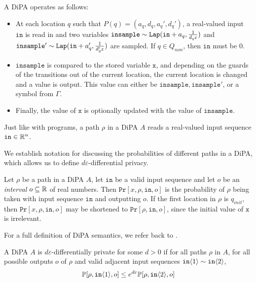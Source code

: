 A DiPA operates as follows: 
\begin{itemize}
    \item At each location $q$ such that $P(q) = (a_q, d_q, a_q', d_q')$, a real-valued input $\texttt{in}$ is read in and two variables $\texttt{insample}\sim \texttt{Lap}(\texttt{in}+a_q, \frac{1}{d_q\varepsilon})$ and $\texttt{insample}'\sim\texttt{Lap}(\texttt{in}+a_q', \frac{1}{d_q'\varepsilon})$ are sampled. If $q\in Q_{non}$, then $\texttt{in}$ must be 0.
    \item $\texttt{insample}$ is compared to the stored variable $\texttt{x}$, and depending on the guards of the transitions out of the current location, the current location is changed and a value is output. This value can either be $\texttt{insample}, \texttt{insample}'$, or a symbol from $\Gamma$.
    \item Finally, the  value of $\texttt{x}$ is optionally updated with the value of $\texttt{insample}$.
\end{itemize}

Just like with programs, a path $\rho$ in a DiPA $A$ reads a real-valued input sequence $\texttt{in}\in \mathbb{R}^n$.

We establish notation for discussing the probabilities of different paths in a DiPA, which allows us to define $d\varepsilon$-differential privacy. 

\begin{defn} 
    Let $\rho$ be a path in a DiPA $A$, let $\texttt{in}$ be a valid input sequence and let $o$ be an \textit{interval} $o\subseteq \mathbb{R}$ of real numbers.
    Then $\texttt{Pr}[x, \rho, \texttt{in}, o]$ is the probability of $\rho$ being taken with input sequence $\texttt{in}$ and outputting $o$. If the first location in $\rho$ is $q_{init}$, then $\texttt{Pr}[x, \rho, \texttt{in}, o]$ may be shortened to $\texttt{Pr}[\rho, \texttt{in}, o]$, since the initial value of $\texttt{x}$ is irrelevant.
\end{defn}

For a full definition of DiPA semantics, we refer back to \cite{chadhaLinearTimeDecidability2021}. 

\begin{defn}
    A DiPA $A$ is $d\varepsilon$-differentially private for some $d>0$ if for all paths $\rho$ in $A$, for all possible outputs $o$ of $\rho$ and valid adjacent input sequences $\texttt{in}\langle1 \rangle\sim \texttt{in}\langle2 \rangle$, \[
        \mathbb{P}[\rho, \texttt{in}\langle1 \rangle, o]\leq e^{d\varepsilon} \mathbb{P}[\rho, \texttt{in}\langle2 \rangle, o]
    \]
\end{defn}

